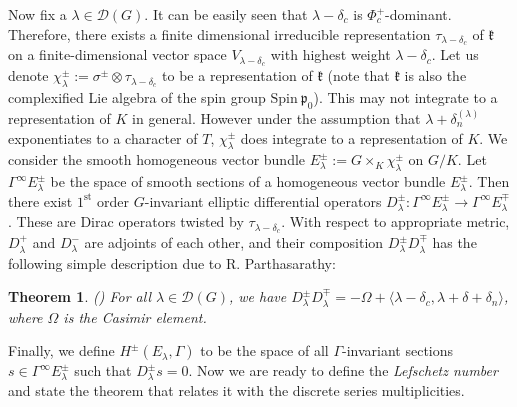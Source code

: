 \documentclass[11 pt]{amsart}
\newtheorem{theorem}{Theorem}[section]
\theoremstyle{definition}
\numberwithin{equation}{section}
\begin{document}
\vspace{5pt}

\noindent Now fix a $\lambda \in \mathcal{D}(G)$. It can be easily seen that $\lambda - \delta_c$ is $\Phi^+_c$-dominant. Therefore, there exists a finite dimensional irreducible representation $\tau_{\lambda -\delta_c}$ of $\mathfrak{k}$ on a finite-dimensional vector space $V_{\lambda - \delta_c}$ with highest weight $\lambda - \delta_c$. Let us denote $\chi_{\lambda}^{\pm} := \sigma^{\pm} \otimes \tau_{\lambda - \delta_c}$ to be a representation of $\mathfrak{k}$ (note that $\mathfrak{k}$ is also the complexified Lie algebra of the spin group $\text{Spin}\ \mathfrak{p}_0$). This may not integrate to a representation of $K$ in general. However under the assumption that $\lambda + \delta_n^{(\lambda)}$ exponentiates to a character of $T$, $\chi_{\lambda}^{\pm}$ does integrate to a representation of $K$. We consider the smooth homogeneous vector bundle $E_{\lambda}^{\pm} := G \times_K \chi_{\lambda}^{\pm}$ on $G/K$. Let $\Gamma^{\infty} E^{\pm}_{\lambda}$ be the space of smooth sections of a homogeneous vector bundle $E^{\pm}_{\lambda}$. Then there exist $1^{\text{st}}$ order $G$-invariant elliptic differential operators $D_{\lambda}^{\pm} : \Gamma^{\infty} E_{\lambda}^{\pm} \longrightarrow \Gamma^{\infty} E_{\lambda}^{\mp}$. These are Dirac operators twisted by $\tau_{\lambda - \delta_c}$. With respect to appropriate metric, $D_{\lambda}^+$ and $D_{\lambda}^-$ are adjoints of each other, and their composition $D_{\lambda}^{\pm} D_{\lambda}^{\mp}$ has the following simple description due to R. Parthasarathy:

\begin{theorem}(\cite{RP})
\textit{For all $\lambda \in \mathcal{D}(G)$, we have $D_{\lambda}^{\pm} D_{\lambda}^{\mp}= - \Omega + \langle \lambda-\delta_c , \lambda + \delta +\delta_n \rangle$, where $\Omega$ is the Casimir element.} 
\end{theorem}

\noindent Finally, we define $H^{\pm}(E_{\lambda} , \Gamma)$ to be the space of all $\Gamma$-invariant sections $s \in \Gamma^{\infty} E_{\lambda}^{\pm}$ such that $D_{\lambda}^{\pm} s = 0 $. Now we are ready to define the \textit{Lefschetz number} and state the theorem that relates it with the discrete series multiplicities.

\end{document}
